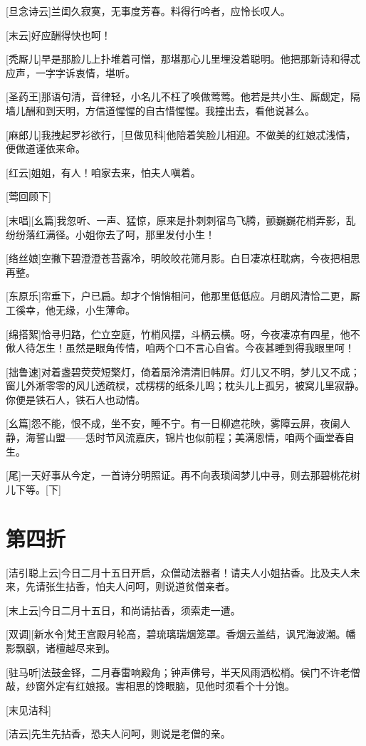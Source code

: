 \documentclass{book}
\newcommand\nchapter[1]{\chapter*{#1}\markboth{#1}{}\addcontentsline{toc}{chapter}{#1}}
\begin{document}
[旦念诗云]兰闺久寂寞，无事度芳春。料得行吟者，应怜长叹人。

[末云]好应酬得快也呵！

[秃厮儿]早是那脸儿上扑堆着可憎，那堪那心儿里埋没着聪明。他把那新诗和得忒应声，一字字诉衷情，堪听。

[圣药王]那语句清，音律轻，小名儿不枉了唤做莺莺。他若是共小生、厮觑定，隔墙儿酬和到天明，方信道惺惺的自古惜惺惺。我撞出去，看他说甚么。

[麻郎儿]我拽起罗衫欲行，[旦做见科]他陪着笑脸儿相迎。不做美的红娘忒浅情，便做道谨依来命。

[红云]姐姐，有人！咱家去来，怕夫人嗔着。

[莺回顾下]

[末唱][幺篇]我忽听、一声、猛惊，原来是扑刺刺宿鸟飞腾，颤巍巍花梢弄影，乱纷纷落红满径。小姐你去了呵，那里发付小生！

[络丝娘]空撇下碧澄澄苍苔露冷，明皎皎花筛月影。白日凄凉枉耽病，今夜把相思再整。

[东原乐]帘垂下，户已扃。却才个悄悄相问，他那里低低应。月朗风清恰二更，厮工徯幸，他无缘，小生薄命。

[绵搭絮]恰寻归路，伫立空庭，竹梢风摆，斗柄云横。呀，今夜凄凉有四星，他不偢人待怎生！虽然是眼角传情，咱两个口不言心自省。今夜甚睡到得我眼里呵！

[拙鲁速]对着盏碧荧荧短檠灯，倚着扇泠清清旧帏屏。灯儿又不明，梦儿又不成；窗儿外淅零零的风儿透疏棂，忒楞楞的纸条儿鸣；枕头儿上孤另，被窝儿里寂静。你便是铁石人，铁石人也动情。

[幺篇]怨不能，恨不成，坐不安，睡不宁。有一日柳遮花映，雾障云屏，夜阑人静，海誓山盟——恁时节风流嘉庆，锦片也似前程；美满恩情，咱两个画堂春自生。

[尾]一天好事从今定，一首诗分明照证。再不向表琐闼梦儿中寻，则去那碧桃花树儿下等。[下]

\nchapter{第四折}

[洁引聪上云]今日二月十五日开启，众僧动法器者！请夫人小姐拈香。比及夫人未来，先请张生拈香，怕夫人问呵，则说道贫僧亲者。

[末上云]今日二月十五日，和尚请拈香，须索走一遭。

[双调][新水令]梵王宫殿月轮高，碧琉璃瑞烟笼罩。香烟云盖结，讽咒海波潮。幡影飘飖，诸檀越尽来到。

[驻马听]法鼓金铎，二月春雷响殿角；钟声佛号，半天风雨洒松梢。侯门不许老僧敲，纱窗外定有红娘报。害相思的馋眼脑，见他时须看个十分饱。

[末见洁科]

[洁云]先生先拈香，恐夫人问呵，则说是老僧的亲。
\end{document}
